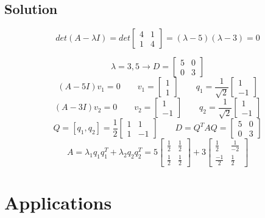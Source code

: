 \subsection*{Solution}
$$det(A-\lambda I) = det\begin{bmatrix}
    4&1\\1&4
\end{bmatrix} = (\lambda - 5)(\lambda - 3) = 0$$

$$\lambda = 3, 5 \rightarrow D = \begin{bmatrix}
    5&0\\0&3
\end{bmatrix}$$
$$(A-5I)v_1 = 0\qquad v_1 = \begin{bmatrix}
    1\\1
\end{bmatrix}\qquad q_1 = \frac{1}{\sqrt{2}}\begin{bmatrix}
    1\\-1
\end{bmatrix}$$
$$(A-3I)v_2 = 0\qquad v_2 = \begin{bmatrix}
    1\\-1
\end{bmatrix}\qquad q_2 = \frac{1}{\sqrt{2}}\begin{bmatrix}
    1\\-1
\end{bmatrix}$$
$$Q = [q_1, q_2] = \frac{1}{2}\begin{bmatrix}
    1&1\\1&-1
\end{bmatrix}\qquad D = Q^TAQ = \begin{bmatrix}
    5&0\\0&3
\end{bmatrix}$$
$$A = \lambda_1q_1q^T_1 + \lambda_2q_2q^T_2 = 5\begin{bmatrix}
    \frac{1}{2}&\frac{1}{2}\\\frac{1}{2}&\frac{1}{2}
\end{bmatrix} + 3\begin{bmatrix}
    \frac{1}{2}&\frac{1}{-2}\\\frac{-1}{2}&\frac{1}{2}
\end{bmatrix}$$

\section{Applications}

